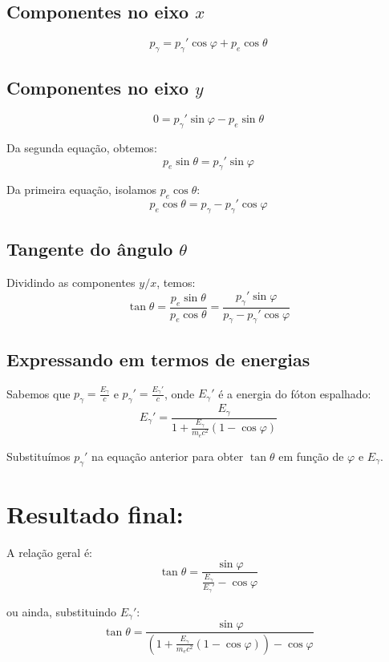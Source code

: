\documentclass[a4paper,12pt]{article}
\begin{document}
\begin{flushleft}
\subsection*{Componentes no eixo \(x\)}

\[
p_\gamma = p_\gamma' \cos\varphi + p_e \cos\theta
\]

\subsection*{Componentes no eixo \(y\)}

\[
0 = p_\gamma' \sin\varphi - p_e \sin\theta
\]

Da segunda equação, obtemos:
\[
p_e \sin\theta = p_\gamma' \sin\varphi
\]

Da primeira equação, isolamos \( p_e \cos\theta \):
\[
p_e \cos\theta = p_\gamma - p_\gamma' \cos\varphi
\]

\subsection*{Tangente do ângulo \( \theta \)}

Dividindo as componentes \(y/x\), temos:
\[
\tan\theta = \frac{p_e \sin\theta}{p_e \cos\theta} =
\frac{p_\gamma' \sin\varphi}{p_\gamma - p_\gamma' \cos\varphi}
\]

\subsection*{Expressando em termos de energias}

Sabemos que \( p_\gamma = \frac{E_\gamma}{c} \) e \( p_\gamma' = \frac{E_\gamma'}{c} \), onde \( E_\gamma' \) é a energia do fóton espalhado:
\[
E_\gamma' = \frac{E_\gamma}{1 + \frac{E_\gamma}{m_e c^2}(1 - \cos\varphi)}
\]

Substituímos \( p_\gamma' \) na equação anterior para obter \( \tan\theta \) em função de \( \varphi \) e \( E_\gamma \).

\section*{Resultado final:}

A relação geral é:
\[
\tan\theta =
\frac{\sin\varphi}{\displaystyle \frac{E_\gamma}{E_\gamma'} - \cos\varphi}
\]

ou ainda, substituindo \( E_\gamma' \):
\[
\tan\theta =
\frac{\sin\varphi}{\displaystyle \left( 1 + \frac{E_\gamma}{m_e c^2}(1 - \cos\varphi) \right) - \cos\varphi}
\]


\end{flushleft}
\end{document}
